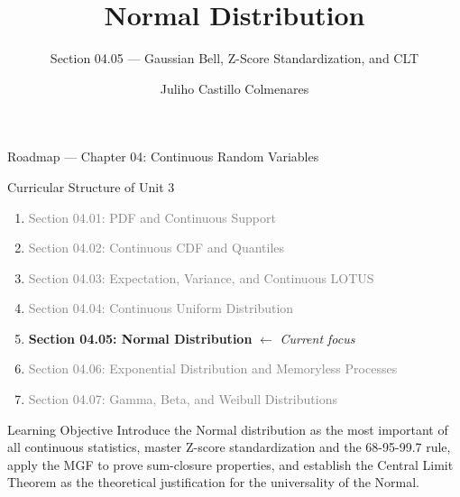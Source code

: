 \documentclass[aspectratio=169,xcolor={dvipsnames,table}]{beamer}
\title{Normal Distribution}
\subtitle{Section 04.05 --- Gaussian Bell, Z-Score Standardization, and CLT}
\author[J. Castillo Colmenares]{Juliho Castillo Colmenares}
\institute[Tec de Monterrey]{Tecnologico de Monterrey}
\date{\vspace{-1.5cm}}
\begin{document}
\begin{frame}[plain]
	\titlepage
\end{frame}

\begin{frame}{Roadmap --- Chapter 04: Continuous Random Variables}
	\vspace{-0.15cm}
	\begin{block}{Curricular Structure of Unit 3}
		\footnotesize
		\begin{enumerate}\itemsep=0.03cm
			\item \textcolor{gray}{Section 04.01: PDF and Continuous Support}
			\item \textcolor{gray}{Section 04.02: Continuous CDF and Quantiles}
			\item \textcolor{gray}{Section 04.03: Expectation, Variance, and Continuous LOTUS}
			\item \textcolor{gray}{Section 04.04: Continuous Uniform Distribution}
			\item \textbf{\textcolor{TecRojo}{Section 04.05: Normal Distribution}} $\leftarrow$ \emph{Current focus}
			\item \textcolor{gray}{Section 04.06: Exponential Distribution and Memoryless Processes}
			\item \textcolor{gray}{Section 04.07: Gamma, Beta, and Weibull Distributions}
		\end{enumerate}
	\end{block}
	\vspace{-0.2cm}
	\begin{alertblock}{Learning Objective}
		\scriptsize
		Introduce the Normal distribution as the most important of all continuous statistics, master Z-score standardization and the 68-95-99.7 rule, apply the MGF to prove sum-closure properties, and establish the Central Limit Theorem as the theoretical justification for the universality of the Normal.
	\end{alertblock}
\end{frame}
\end{document}
